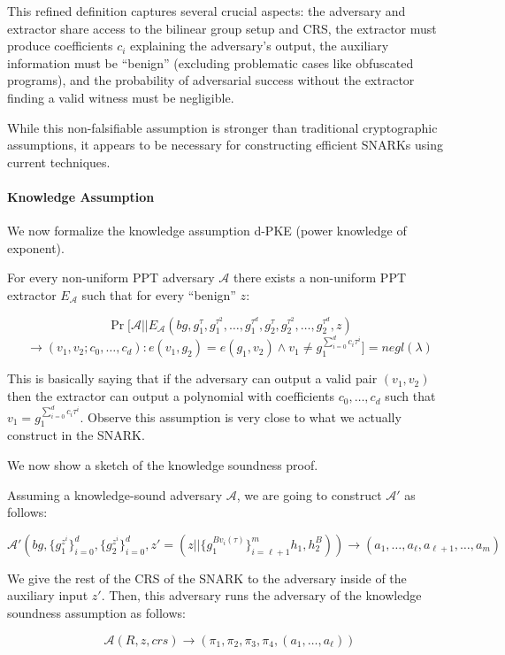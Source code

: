 \documentclass[12pt]{tufte-book}
\begin{document}
This refined definition captures several crucial aspects: the adversary and extractor share access to the bilinear group setup and CRS, the extractor must produce coefficients $c_i$ explaining the adversary's output, the auxiliary information must be ``benign'' (excluding problematic cases like obfuscated programs), and the probability of adversarial success without the extractor finding a valid witness must be negligible.

While this non-falsifiable assumption is stronger than traditional cryptographic assumptions, it appears to be necessary for constructing efficient SNARKs using current techniques.

\paragraph{Knowledge Assumption}

We now formalize the knowledge assumption d-PKE (power knowledge of exponent).

For every non-uniform PPT adversary $\mathcal{A}$ there exists a non-uniform PPT extractor $E_\mathcal{A}$ such that for every ``benign'' $z$:

$$\Pr [\mathcal{A} || E_\mathcal{A} (bg, g_1^\tau, g_1^{\tau^2}, \dots, g_1^{\tau^d}, g_2^\tau, g_2^{\tau^2}, \dots, g_2^{\tau^d}, z)$$
$$\rightarrow (v_1, v_2; c_0, \dots, c_d) : e(v_1, g_2) = e(g_1, v_2) \land v_1 \neq g_1^{\sum_{i=0}^d c_i \tau^i}] = negl(\lambda)$$

This is basically saying that if the adversary can output a valid pair $(v_1, v_2)$ then the extractor can output a polynomial with coefficients $c_0, \dots, c_d$ such that $v_1 = g_1^{\sum_{i=0}^d c_i \tau^i}$. Observe this assumption is very close to what we actually construct in the SNARK.

We now show a sketch of the knowledge soundness proof.

Assuming a knowledge-sound adversary $\mathcal{A}$, we are going to construct $\mathcal{A}'$ as follows:

$$\mathcal{A}'(bg, \{g_1^{z^i}\}_{i=0}^d, \{g_2^{z^i}\}_{i=0}^d, z' = (z || \{g_1^{B v_i(\tau)}\}_{i=\ell+1}^m h_1, h_2^B)) \rightarrow (a_1, \dots, a_\ell, a_{\ell+1}, \dots, a_m)$$

We give the rest of the CRS of the SNARK to the adversary inside of the auxiliary input $z'$. Then, this adversary runs the adversary of the knowledge soundness assumption as follows:

$$\mathcal{A}(R, z, crs) \rightarrow (\pi_1, \pi_2, \pi_3, \pi_4, (a_1, \dots, a_\ell))$$
\end{document}
